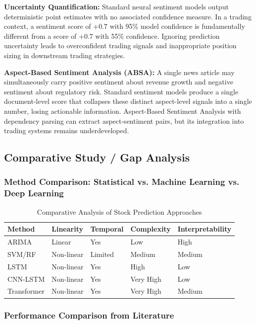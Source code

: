 \textbf{Uncertainty Quantification:}
Standard neural sentiment models output deterministic point estimates with no associated confidence measure. In a trading context, a sentiment score of $+0.7$ with 95\% model confidence is fundamentally different from a score of $+0.7$ with 55\% confidence. Ignoring prediction uncertainty leads to overconfident trading signals and inappropriate position sizing in downstream trading strategies.

\textbf{Aspect-Based Sentiment Analysis (ABSA):}
A single news article may simultaneously carry positive sentiment about revenue growth and negative sentiment about regulatory risk. Standard sentiment models produce a single document-level score that collapses these distinct aspect-level signals into a single number, losing actionable information. Aspect-Based Sentiment Analysis with dependency parsing can extract aspect-sentiment pairs, but its integration into trading systems remains underdeveloped.

\subsection{Comparative Study / Gap Analysis}

\subsubsection{Method Comparison: Statistical vs. Machine Learning vs. Deep Learning}

\begin{table}[htbp]
\centering
\caption{Comparative Analysis of Stock Prediction Approaches}
\begin{tabular}{@{}lllll@{}}
\toprule
\textbf{Method} & \textbf{Linearity} & \textbf{Temporal} & \textbf{Complexity} & \textbf{Interpretability} \\ \midrule
ARIMA & Linear & Yes & Low & High \\
SVM/RF & Non-linear & Limited & Medium & Medium \\
LSTM & Non-linear & Yes & High & Low \\
CNN-LSTM & Non-linear & Yes & Very High & Low \\
Transformer & Non-linear & Yes & Very High & Medium \\ \bottomrule
\end{tabular}
\end{table}

\subsubsection{Performance Comparison from Literature}

